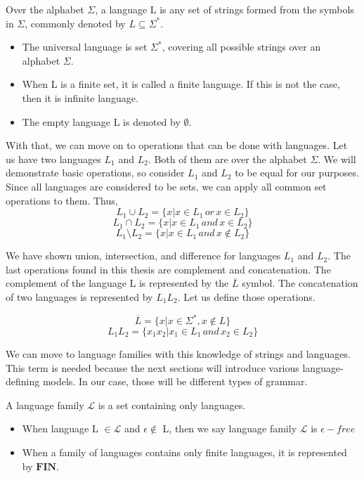 \begin{definition}
\label{Def10}
Over the alphabet $\Sigma$, a language L is any set of strings formed from the symbols in $\Sigma$, commonly denoted by $L \subseteq \Sigma^*$.
\begin{itemize}
  \item{The universal language is set $\Sigma^*$, covering all possible strings over an alphabet $\Sigma$.}
  \item{When L is a finite set, it is called a finite language. If this is not the case, then it is infinite language.}
  \item{The empty language L is denoted by $\emptyset$.} 
\end{itemize}
\end{definition}

With that, we can move on to operations that can be done with languages. Let us have two languages $L_1$ and $L_2$. Both of them are over the alphabet $\Sigma$. We will demonstrate basic operations, so consider $L_1$ and $L_2$ to be equal for our purposes. Since all languages are considered to be sets, we can apply all common set operations to them. Thus,
$$ L_1 \cup L_2 = \{x | x \in L_1 \, or \, x \in L_2\}$$
$$ L_1 \cap L_2 = \{x | x \in L_1 \, and \, x \in L_2\}$$
$$ L_1 \setminus L_2 = \{x | x \in L_1 \, and \, x \notin L_2\}$$

We have shown union, intersection, and difference for languages $L_1$ and $L_2$. The last operations found in this thesis are complement and concatenation. The complement of the language L is represented by the $\overline{L}$ symbol. The concatenation of two languages is represented by $L_1L_2$. Let us define those operations.

$$ \overline{L} = \{x | x \in \Sigma^*, x \notin L\}$$
$$ L_1L_2 = \{x_1x_2 | x_1 \in L_1 \, and \, x_2 \in L_2\}$$

We can move to language families with this knowledge of strings and languages. This term is needed because the next sections will introduce various language-defining models. In our case, those will be different types of grammar.

\begin{definition}
\label{Def11}
A language family $\mathcal{L}$ is a set containing only languages.
\begin{itemize}
    \item{When language L $\in \mathcal{L}$ and $\epsilon \notin$ L, then we say language family $ \mathcal{L}$ is $\epsilon - free$}
    \item{When a family of languages contains only finite languages, it is represented by $\mathbf{FIN}$.}
\end{itemize}
\end{definition}

